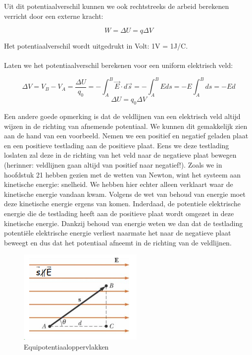 \documentclass[12pt,a4paper]{article}
\begin{document}
    Uit dit potentiaalverschil kunnen we ook rechtstreeks de arbeid berekenen verricht door een externe kracht:
    
    $$W = \Delta U = q\Delta V$$
    
    Het potentiaalverschil wordt uitgedrukt in Volt: 1V = 1J/C.\\
    \\
    Laten we het potentiaalverschil berekenen voor een uniform elektrisch veld:
    
    $$\Delta V = V_{B} - V_{A} = \frac{\Delta U}{q_{0}} = -\int_{A}^{B} \vec{E} \cdot d\vec{s} = -\int_{A}^{B} Eds = -E\int_{A}^{B} ds = -Ed$$
    $$\Delta U = q_{0} \Delta V$$
    
    Een andere goede opmerking is dat de veldlijnen van een elektrisch veld altijd wijzen in de richting van afnemende potentiaal. We kunnen dit gemakkelijk zien
    aan de hand van een voorbeeld. Nemen we een positief en negatief geladen plaat en een positieve testlading aan de positieve plaat. Eens we deze testlading
    loslaten zal deze in de richting van het veld naar de negatieve plaat bewegen (herinner: veldlijnen gaan altijd van positief naar negatief!). Zoals we in 
    hoofdstuk 21 hebben gezien met de wetten van Newton, wint het systeem aan kinetische energie: snelheid. We hebben hier echter alleen verklaart
    waar de kinetische energie vandaan kwam. Volgens de wet van behoud van energie moet deze kinetische energie ergens van komen. Inderdaad,
    de potentiele elektrische energie die de testlading heeft aan de positieve plaat wordt omgezet in deze kinetische energie. Dankzij behoud van energie weten we dan 
    dat de testlading potentiële elektrische energie verliest naarmate het naar de negatieve plaat beweegt en dus dat het potentiaal afneemt in de richting van de 
    veldlijnen. \\
    
    \begin{figure}[h]
    	\centering
	\includegraphics[width=0.4\linewidth]{equipot_oppervlakken}
    	\caption{Equipotentiaaloppervlakken}
        	\label{equipot_opp}
    \end{figure}
    
\end{document}
